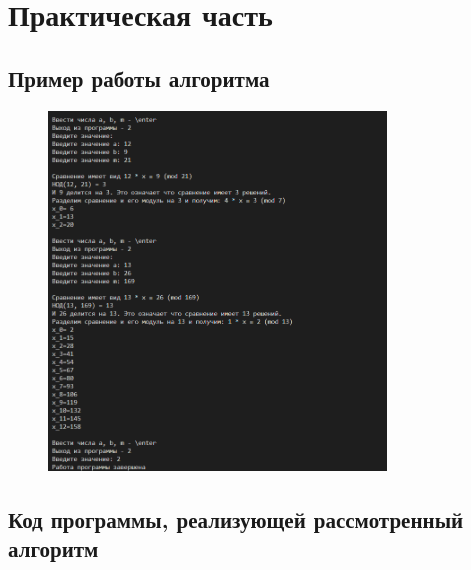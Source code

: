 \documentclass[bachelor, och, labwork]{shiza}
\begin{document}
\section{Практическая часть}
\subsection{Пример работы алгоритма}
\begin{figure}[H]
    \centering
    \includegraphics[width=0.8\textwidth]{pic1.png}
    \caption{}
\end{figure}

    \subsection{Код программы, реализующей рассмотренный алгоритм}
        \inputminted{python}{lab1.py}
\end{document}
